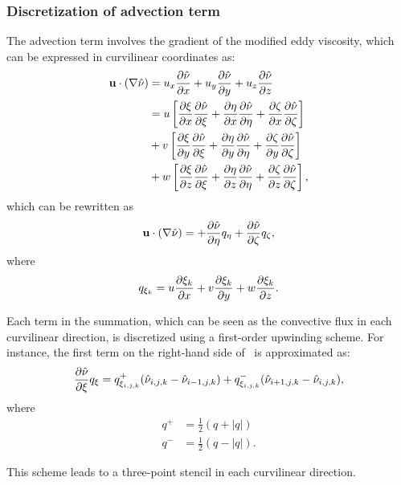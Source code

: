 \subsubsection{Discretization of advection term}
The advection term involves the gradient of the modified eddy viscosity, which can be expressed in curvilinear coordinates as:
\begin{align*}
    \vec{u}\cdot(\nabla\sa) &=
        u_x\pdiff{\sa}{x}
        + u_y\pdiff{\sa}{y}
        + u_z\pdiff{\sa}{z} \\
    &=
    u\left[
        \pdiff{\xi}{x}\pdiff{\sa}{\xi} + \pdiff{\eta}{x}\pdiff{\sa}{\eta} +
            \pdiff{\zeta}{x}\pdiff{\sa}{\zeta}
    \right]
    \\
    &+
    v\left[
        \pdiff{\xi}{y}\pdiff{\sa}{\xi} + \pdiff{\eta}{y}\pdiff{\sa}{\eta} +
            \pdiff{\zeta}{y}\pdiff{\sa}{\zeta}
    \right]
    \\
    &+
    w\left[
        \pdiff{\xi}{z}\pdiff{\sa}{\xi} + \pdiff{\eta}{z}\pdiff{\sa}{\eta} +
            \pdiff{\zeta}{z}\pdiff{\sa}{\zeta}
    \right],
\end{align*}
which can be rewritten as
\begin{equation}
    \vec{u}\cdot(\nabla\sa) =  + \pdiff{\sa}{\eta}q_\eta + \pdiff{\sa}{\zeta}q_\zeta
    \label{eq:saadvfd},
\end{equation}
where
\begin{equation*}
    q_{\xi_k} = u \frac{\partial \xi_k}{\partial x}  + v \frac{\partial \xi_k}{\partial y}  + w \frac{\partial \xi_k}{\partial z} .
\end{equation*}

Each term in the summation, which can be seen as the convective flux in each curvilinear direction, is discretized using a first-order upwinding scheme. For instance, the first term on the right-hand side of~ is approximated as:
\begin{equation*}
    \pdiff{\sa}{\xi}q_\xi = q_{\xi_{i,j,k}}^+ (\sa_{i,j,k}- \sa_{i-1,j,k})
        + q_{\xi_{i,j,k}}^- ( \sa_{i+1,j,k} - \sa_{i,j,k}),
\end{equation*}
where
\begin{align*}
    q^+ &= \frac{1}{2}(q + |q|) \\
    q^- &= \frac{1}{2}(q - |q|).
\end{align*}

This scheme leads to a three-point stencil in each curvilinear direction.

%
